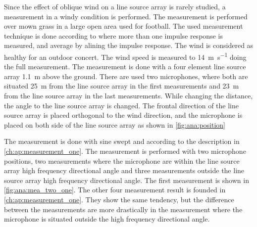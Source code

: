 Since the effect of oblique wind on a line source array is rarely studied, a measurement in a windy condition is performed. The measurement is performed over mown grass in a large open area used for football. The used measurement technique is done according to \citep{gunness2001loudspeaker} where more than one impulse response is measured, and average by alining the impulse response. The wind is considered as healthy for an outdoor concert. The wind speed is measured to  \SI{14}{\meter\per\second} doing the full measurement. The measurement is done with a four element line source array \SI{1.1}{\meter} above the ground. There are used two microphones, where both are situated \SI{25}{\meter} from the line source array in the first measurements and \SI{23}{\meter} from the line source array in the last measurements. While changing the distance, the angle to the line source array is changed.  The frontal direction of the line source array is placed orthogonal to the wind direction, and the microphone is placed on both side of the line source array as shown in \autoref{fig:ana:position}



The measurement is done with sine swept and according to the description in \autoref{ch:ap:measurement_one}. The measurement is performed with two microphone positions, two measurements where the microphone are within the line source array high frequency directional angle and three measurements outside the line source array high frequency directional angle. The first measurement is shown in \autoref{fig:ana:mea_two_one}. The other four measurement result is founded in \autoref{ch:ap:measurement_one}. They show the same tendency, but the difference between the measurements are more drastically in the measurement where the microphone is situated outside the high frequency directional angle. 



